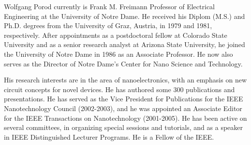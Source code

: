 \documentclass[journal]{IEEEtran}
\begin{document}
\begin{IEEEbiography} 
{Wolfgang Porod} currently is Frank M. Freimann Professor of Electrical Engineering at the University of Notre Dame. He received his Diplom (M.S.) and Ph.D. degrees from the University of Graz, Austria, in 1979 and 1981, respectively. After appointments as a postdoctoral fellow at Colorado State University and as a senior research analyst at Arizona State University, he joined the University of Notre Dame in 1986 as an Associate Professor. He now also serves as the Director of Notre Dame's Center for Nano Science and Technology. 

His research interests are in the area of nanoelectronics, with an emphasis on new circuit concepts for novel devices. He has authored some 300 publications and presentations. He has served as the Vice President for Publications for the IEEE Nanotechnology Council (2002-2003), and he was appointed an Associate Editor for the IEEE Transactions on Nanotechnology (2001-2005). He has been active on several committees, in organizing special sessions and tutorials, and as a speaker in IEEE Distinguished Lecturer Programs. He is a Fellow of the IEEE.
\end{IEEEbiography}
\end{document}
